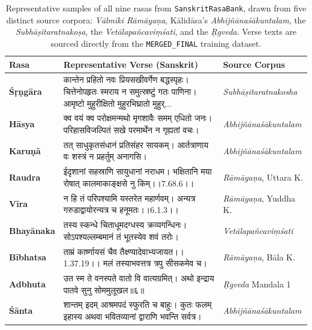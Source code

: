 \documentclass[11pt]{article}
\newcommand{\skt}[1]{{\devanagarifont #1}}
\newcommand{\skt}[1]{#1}
\begin{document}
\begin{table}[t]
\centering
\small
\begin{tabular}{p{1.7cm} p{9.5cm} p{3cm}}
\toprule
\textbf{Rasa} & \textbf{Representative Verse (Sanskrit)} & \textbf{Source Corpus} \\
\midrule
\textbf{Ś\d r\d ng\=ara} & \skt{कान्तेन प्रहितो नवः प्रियसखीवर्गेण बद्धस्पृहः। चित्तेनोपहृतः स्मराय न समुत्स्रष्टुं गतः पाणिना। आमृष्टो मुहुरीक्षितो मुहुरभिघ्रातो मुहुर्...} & \textit{Subh\=a\d sitaratnakosha} \\
\textbf{H\=asya} & \skt{क्व वयं क्व परोक्षमन्मथो मृगशावैः समम् एधितो जनः। परिहासविजल्पितं सखे परमार्थेन न गृह्यतां वचः।} & \textit{Abhij\~n\=anaś\=akuntalam} \\
\textbf{Karu\d n\=a} & \skt{तत् साधुकृतसंधानं प्रतिसंहर सायकम्। आर्तत्राणाय वः शस्त्रं न प्रहर्तुम् अनागसि।} & \textit{Abhij\~n\=anaś\=akuntalam} \\
\textbf{Raudra} & \skt{ईदृशानां सहस्राणि सायुधानां नराधम। भक्षितानि मया रोषात् कालमाकाङ्क्षसे नु किम्।।7.68.6।।} & \textit{R\=am\=aya\d na}, Uttara K. \\
\textbf{V\=ira} & \skt{न हि तं परिपश्यामि यस्तरेत महार्णवम्। अन्यत्र गरुडाद्वायोरन्यत्र च हनूमतः।।6.1.3।।} & \textit{R\=am\=aya\d na}, Yuddha K. \\
\textbf{Bhay\=anaka} & \skt{तस्य स्कन्धे चिताधूमदग्धस्य क्रव्यगन्धिनः। सोऽपश्यल्लम्बमानं तं भूतस्येव शवं तरोः।} & \textit{Vet\=alapañcavi\d m\'{s}ati} \\
\textbf{B\=ibhatsa} & \skt{ताम्रं कार्ष्णायसं चैव तैक्ष्ण्यादेवाभ्यजायत।।1.37.19।। मलं तस्याभवत्तत्र त्रपु सीसकमेव च।} & \textit{R\=am\=aya\d na}, B\=ala K. \\
\textbf{Adbhuta} & \skt{उत स्म ते वनस्पते वातो वि वात्यग्रमित्। अथो इन्द्राय पातवे सुनु सोममुलूखल॥६॥} & \textit{\d Rgveda} Mandala 1 \\
\textbf{Ś\=anta} & \skt{शान्तम् इदम् आश्रमपदं स्फुरति च बाहुः। कुतः फलम् इहास्य अथवा भवितव्यानां द्वाराणि भवन्ति सर्वत्र।} & \textit{Abhij\~n\=anaś\=akuntalam} \\
\bottomrule
\end{tabular}
\caption{Representative samples of all nine rasas from \texttt{SanskritRasaBank}, drawn from five distinct source corpora: \textit{Vālmīki Rāmāyaṇa}, Kālidāsa's \textit{Abhijñānaśākuntalam}, the \textit{Subhāṣitaratnakoṣa}, the \textit{Vetālapañcaviṃśati}, and the \textit{Ṛgveda}. Verse texts are sourced directly from the \texttt{MERGED\_FINAL} training dataset.}
\label{tab:rasa_samples}
\end{table}
\end{document}
